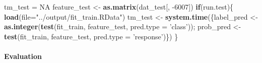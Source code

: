 \documentclass[
]{article}
\newenvironment{Shaded}{\begin{snugshade}}{\end{snugshade}}
\newcommand{\ControlFlowTok}[1]{\textcolor[rgb]{0.13,0.29,0.53}{\textbf{#1}}}
\newcommand{\DataTypeTok}[1]{\textcolor[rgb]{0.13,0.29,0.53}{#1}}
\newcommand{\DecValTok}[1]{\textcolor[rgb]{0.00,0.00,0.81}{#1}}
\newcommand{\KeywordTok}[1]{\textcolor[rgb]{0.13,0.29,0.53}{\textbf{#1}}}
\newcommand{\NormalTok}[1]{#1}
\newcommand{\OtherTok}[1]{\textcolor[rgb]{0.56,0.35,0.01}{#1}}
\newcommand{\StringTok}[1]{\textcolor[rgb]{0.31,0.60,0.02}{#1}}
\begin{document}
\begin{Shaded}
\begin{Highlighting}[]
\NormalTok{tm_test =}\StringTok{ }\OtherTok{NA}
\NormalTok{feature_test <-}\StringTok{ }\KeywordTok{as.matrix}\NormalTok{(dat_test[, }\DecValTok{-6007}\NormalTok{])}
\ControlFlowTok{if}\NormalTok{(run.test)\{}
  \KeywordTok{load}\NormalTok{(}\DataTypeTok{file=}\StringTok{"../output/fit_train.RData"}\NormalTok{)}
\NormalTok{  tm_test <-}\StringTok{ }\KeywordTok{system.time}\NormalTok{(\{label_pred <-}\StringTok{ }\KeywordTok{as.integer}\NormalTok{(}\KeywordTok{test}\NormalTok{(fit_train, feature_test, }\DataTypeTok{pred.type =} \StringTok{'class'}\NormalTok{)); }
\NormalTok{                          prob_pred <-}\StringTok{ }\KeywordTok{test}\NormalTok{(fit_train, feature_test, }\DataTypeTok{pred.type =} \StringTok{'response'}\NormalTok{)\})}
\NormalTok{\}}
\end{Highlighting}
\end{Shaded}

\hypertarget{evaluation}{%
\paragraph{Evaluation}\label{evaluation}}
\end{document}
